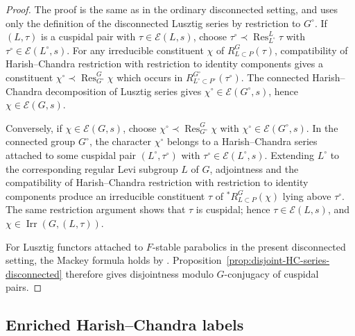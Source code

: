 \documentclass{amsart}
\theoremstyle{plain}
\numberwithin{equation}{section}
\theoremstyle{definition}
\newcommand{\cE}{\mathcal{E}}
\newcommand{\Res}{\operatorname{Res}}
\newcommand{\Irr}{\operatorname{Irr}}
\begin{document}
\begin{proof}
The proof is the same as in the ordinary disconnected setting, and uses only the
definition of the disconnected Lusztig series by restriction to \(G^\circ\).  If
\((L,\tau)\) is a cuspidal pair with \(\tau\in\cE(L,s)\), choose
\(\tau^\circ\prec\Res^L_{L^\circ}\tau\) with
\(\tau^\circ\in\cE(L^\circ,s)\).  For any irreducible constituent
\(\chi\) of \(R^G_{L\subset P}(\tau)\), compatibility of Harish--Chandra
restriction with restriction to identity components gives a constituent
\(\chi^\circ\prec\Res^G_{G^\circ}\chi\) which occurs in
\(R^{G^\circ}_{L^\circ\subset P^\circ}(\tau^\circ)\).  The connected
Harish--Chandra decomposition of Lusztig series gives
\(\chi^\circ\in\cE(G^\circ,s)\), hence \(\chi\in\cE(G,s)\).

Conversely, if \(\chi\in\cE(G,s)\), choose
\(\chi^\circ\prec\Res^G_{G^\circ}\chi\) with
\(\chi^\circ\in\cE(G^\circ,s)\).  In the connected group \(G^\circ\), the
character \(\chi^\circ\) belongs to a Harish--Chandra series attached to some
cuspidal pair \((L^\circ,\tau^\circ)\) with \(\tau^\circ\in\cE(L^\circ,s)\).
Extending \(L^\circ\) to the corresponding regular Levi subgroup \(L\) of
\(G\), adjointness and the compatibility of Harish--Chandra restriction with
restriction to identity components produce an irreducible constituent
\(\tau\) of \({}^*R^G_{L\subset P}(\chi)\) lying above \(\tau^\circ\).  The same
restriction argument shows that \(\tau\) is cuspidal; hence
\(\tau\in\cE(L,s)\), and \(\chi\in\Irr(G,(L,\tau))\).

For Lusztig functors attached to \(F\)-stable parabolics in the present
disconnected setting, the Mackey formula holds by
\cite[Theorem~3.2]{DigneMichel94}.  Proposition~\ref{prop:disjoint-HC-series-disconnected}
therefore gives disjointness modulo \(G\)-conjugacy of cuspidal pairs.
\end{proof}

\medskip
\subsection{Enriched Harish--Chandra labels}
\label{subsec:enriched-HC-labels-disconnected}
\end{document}
